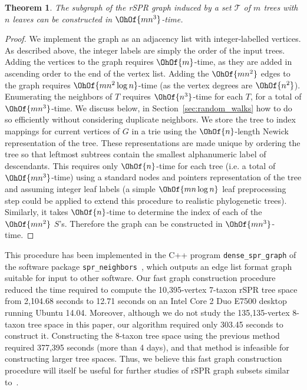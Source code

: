 \documentclass[11pt,onecolumn,conference]{IEEEtran}
\newtheorem{theorem}{Theorem}[section]
\begin{document}
\begin{theorem}
	\label{thm:construct_graph}
	The subgraph of the rSPR graph induced by a set $\mathcal{T}$ of $m$ trees with $n$ leaves can be constructed in $\OhOf{mn^3}$-time.
\end{theorem}
\begin{proof}
	We implement the graph as an adjacency list with integer-labelled vertices.
	As described above, the integer labels are simply the order of the input trees.
	Adding the vertices to the graph requires $\OhOf{m}$-time, as they are added in ascending order to the end of the vertex list.
	Adding the $\OhOf{mn^2}$ edges to the graph requires $\OhOf{mn^2 \log n}$-time (as the vertex degrees are $\OhOf{n^2}$).
	Enumerating the neighbors of $T$ requires $\OhOf{n^3}$-time for each $T$, for a total of $\OhOf{mn^3}$-time.
	We discuss below, in Section~\ref{sec:random_walks} how to do so efficiently without considering duplicate neighbors.
	We store the tree to index mappings for current vertices of $G$ in a trie using the $\OhOf{n}$-length Newick representation of the tree.
	These representations are made unique by ordering the tree so that leftmost subtrees contain the smallest alphanumeric label of descendants.
	This requires only $\OhOf{n}$-time for each tree (i.e. a total of $\OhOf{mn^3}$-time) using a standard nodes and pointers representation of the tree and assuming integer leaf labels (a simple $\OhOf{mn\log n}$ leaf preprocessing step could be applied to extend this procedure to realistic phylogenetic trees).
	Similarly, it takes $\OhOf{n}$-time to determine the index of each of the $\OhOf{mn^2}$ $S$'s.
	Therefore the graph can be constructed in $\OhOf{mn^3}$-time.
\end{proof}
This procedure has been implemented in the C++ program \texttt{dense\_spr\_graph} of the software package \texttt{spr\_neighbors}~\cite{spr_neighbors}, which outputs an edge list format graph suitable for input to other software.
Our fast graph construction procedure reduced the time required to compute the 10,395-vertex 7-taxon rSPR tree space from 2,104.68 seconds to 12.71 seconds on an Intel Core 2 Duo E7500 desktop running Ubuntu 14.04.
Moreover, although we do not study the 135,135-vertex 8-taxon tree space in this paper, our algorithm required only 303.45 seconds to construct it.
Constructing the 8-taxon tree space using the previous method required 377,395 seconds (more than 4 days), and that method is infeasible for constructing larger tree spaces.
Thus, we believe this fast graph construction procedure will itself be useful for further studies of rSPR graph subsets similar to~\cite{Whidden2015-yi}.
\end{document}
